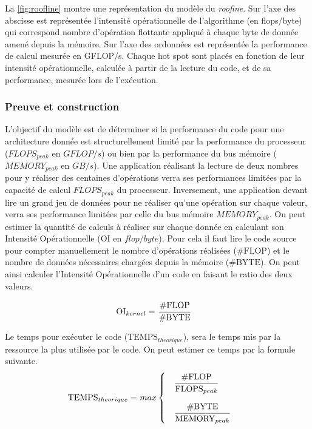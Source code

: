 La \autoref{fig:roofline} montre une représentation du modèle du \textit{roofine}. Sur l’axe des abscisse est représentée l’intensité opérationnelle de l’algorithme (en flops/byte) qui correspond nombre d’opération flottante appliqué à chaque byte de donnée amené depuis la mémoire. Sur l’axe des ordonnées est représentée la performance de calcul mesurée en GFLOP/s.
Chaque hot spot sont placés en fonction de leur intensité opérationnelle, calculée à partir de la lecture du code, et de sa performance, mesurée lors de l’exécution.

\subsubsection{Preuve et construction}

L’objectif du modèle est de déterminer si la performance du code pour une architecture donnée est structurellement limité par la performance du processeur ($FLOPS_{peak}$ en $GFLOP/s$) ou bien par la performance du bus mémoire ($MEMORY_{peak}$ en $GB/s$). Une application réalisant la lecture de deux nombres pour y réaliser des centaines d’opérations verra ses performances limitées par la capacité de calcul $FLOPS_{peak}$ du processeur. Inversement, une application devant lire un grand jeu de données pour ne réaliser qu'une opération sur chaque valeur, verra ses performance limitées par celle du bus mémoire $MEMORY_{peak}$. On peut estimer la quantité de calculs à réaliser sur chaque donnée en calculant son Intensité Opérationnelle  ($\text{OI}$ en $flop/byte$). Pour cela il faut lire le code source pour compter manuellement le nombre d’opérations réalisées ($\text{\#FLOP}$) et le nombre de données nécessaires chargées depuis la mémoire ($\text{\#BYTE}$). On peut ainsi calculer l’Intensité Opérationnelle d’un code en faisant le ratio des deux valeurs.

\begin{equation}
\begin{aligned}
        \text{OI}_{kernel} =\ &\cfrac{\text{\#FLOP}}{\text{\#BYTE}}
\end{aligned}
\end{equation}

Le temps pour exécuter le code ($\text{TEMPS}_{theorique}$), sera le temps mis par la ressource la plus utilisée par le code. On peut estimer ce temps par la formule suivante.
\begin{equation}
\begin{aligned}
     \text{TEMPS}_{theorique} =\  &max 
     \begin{cases} 
        \quad \cfrac{\text{\#FLOP}}{\text{FLOPS}_{peak}}    \\[15pt]
        \quad \cfrac{\text{\#BYTE}}{\text{MEMORY}_{peak}}
    \end{cases}
\end{aligned}
\end{equation}




